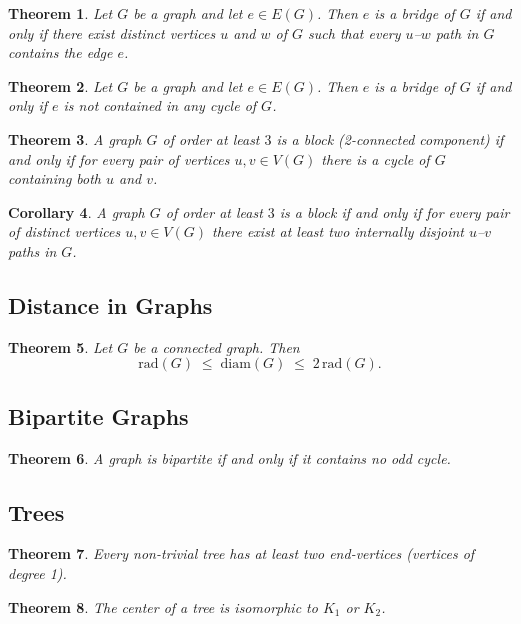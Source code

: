 \documentclass{article}
\newtheorem{theorem}{Theorem}[section]
\newtheorem{corollary}[theorem]{Corollary}
\begin{document}
\begin{theorem}
Let $G$ be a graph and let $e\in E(G)$. Then $e$ is a bridge of $G$ if and only if there exist distinct vertices $u$ and $w$ of $G$ such that every $u$--$w$ path in $G$ contains the edge $e$.
\end{theorem}

\begin{theorem}
Let $G$ be a graph and let $e\in E(G)$. Then $e$ is a bridge of $G$ if and only if $e$ is not contained in any cycle of $G$.
\end{theorem}

\begin{theorem}
A graph $G$ of order at least $3$ is a block (2-connected component) if and only if for every pair of vertices $u,v\in V(G)$ there is a cycle of $G$ containing both $u$ and $v$.
\end{theorem}

\begin{corollary}
A graph $G$ of order at least $3$ is a block if and only if for every pair of distinct vertices $u,v\in V(G)$ there exist at least two internally disjoint $u$--$v$ paths in $G$.
\end{corollary}

\subsection{Distance in Graphs}
\begin{theorem}
Let $G$ be a connected graph. Then 
$$
\mathrm{rad}(G) \;\le\; \mathrm{diam}(G) \;\le\; 2\,\mathrm{rad}(G).
$$
\end{theorem}

\subsection{Bipartite Graphs}
\begin{theorem}
A graph is bipartite if and only if it contains no odd cycle.
\end{theorem}

\subsection{Trees}
\begin{theorem}
Every non-trivial tree has at least two end-vertices (vertices of degree 1).
\end{theorem}

\begin{theorem}
The center of a tree is isomorphic to $K_1$ or $K_2$.
\end{theorem}
\end{document}
